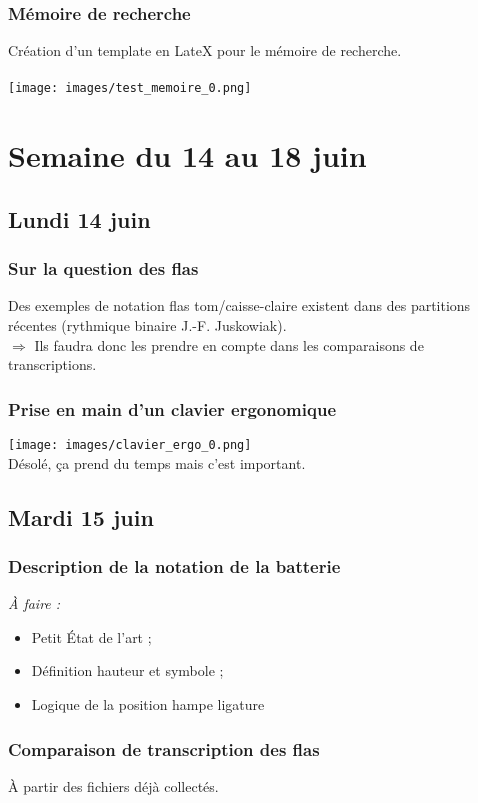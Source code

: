 \documentclass{report}
\begin{document}
\subsection{Mémoire de recherche}
Création d’un template en LateX pour le mémoire de recherche.\\\\
\texttt{[image: images/test\_memoire\_0.png]}\\

\newpage
	\chapter{Semaine du 14 au 18 juin}
	\section{Lundi 14 juin}
	\subsection{Sur la question des flas}
	Des exemples de notation flas tom/caisse-claire existent dans des partitions récentes (rythmique binaire J.-F. Juskowiak).\\
	$\Rightarrow$ Ils faudra donc les prendre en compte dans les comparaisons de transcriptions.
	\subsection{Prise en main d’un clavier ergonomique}
	\texttt{[image: images/clavier\_ergo\_0.png]}\\
	Désolé, ça prend du temps mais c’est important.\\
	\section{Mardi 15 juin}
	\subsection{Description de la notation de la batterie}
	\textit{À faire :}
	\begin{itemize}
		\item Petit État de l’art ;
		\item Définition hauteur et symbole ;
		\item Logique de la position hampe ligature
	\end{itemize}
	\subsection{Comparaison de transcription des flas}
	À partir des fichiers déjà collectés.\\\\
	\newpage
	
\end{document}
